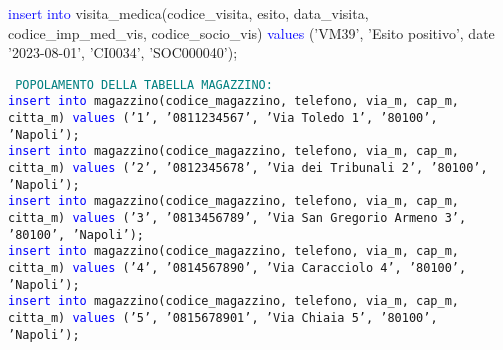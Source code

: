 \documentclass{article}
\begin{document}
\begin{flushleft}
{        \vspace{2mm}
        \hspace*{0.5em}\textcolor{blue}{insert into} visita\_medica(codice\_visita, esito, data\_visita, codice\_imp\_med\_vis, \hspace*{0.5em}codice\_socio\_vis) \textcolor{blue}{values} ('VM39', 'Esito positivo', date '2023-08-01', 'CI0034', \hspace*{0.5em}'SOC000040'); \\}
    \end{flushleft}

    \begin{flushleft}
        \texttt{
        \textcolor{teal}{POPOLAMENTO DELLA TABELLA MAGAZZINO:} \\
        \hspace*{0.5em}\textcolor{blue}{insert into} magazzino(codice\_magazzino, telefono, via\_m, cap\_m, citta\_m) \textcolor{blue}{values} \hspace*{0.5em}('1', '0811234567', 'Via Toledo 1', '80100', 'Napoli'); \\
        \hspace*{0.5em}\textcolor{blue}{insert into} magazzino(codice\_magazzino, telefono, via\_m, cap\_m, citta\_m) \textcolor{blue}{values} \hspace*{0.5em}('2', '0812345678', 'Via dei Tribunali 2', '80100', 'Napoli'); \\
        \hspace*{0.5em}\textcolor{blue}{insert into} magazzino(codice\_magazzino, telefono, via\_m, cap\_m, citta\_m) \textcolor{blue}{values} \hspace*{0.5em}('3', '0813456789', 'Via San Gregorio Armeno 3', '80100', 'Napoli'); \\
        \hspace*{0.5em}\textcolor{blue}{insert into} magazzino(codice\_magazzino, telefono, via\_m, cap\_m, citta\_m) \textcolor{blue}{values} \hspace*{0.5em}('4', '0814567890', 'Via Caracciolo 4', '80100', 'Napoli'); \\
        \hspace*{0.5em}\textcolor{blue}{insert into} magazzino(codice\_magazzino, telefono, via\_m, cap\_m, citta\_m) \textcolor{blue}{values} \hspace*{0.5em}('5', '0815678901', 'Via Chiaia 5', '80100', 'Napoli'); \\}
    \end{flushleft}
\end{document}
